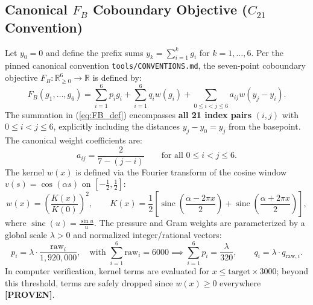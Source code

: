 \documentclass[11pt,a4paper]{article}
\theoremstyle{remark}
\newcommand{\sinc}{\operatorname{sinc}}
\begin{document}
\subsection{Canonical $F_B$ Coboundary Objective ($C_{21}$ Convention)}
Let $y_0 = 0$ and define the prefix sums $y_k = \sum_{i=1}^k g_i$ for $k=1,\ldots,6$. Per the pinned canonical convention \texttt{tools/CONVENTIONS.md}, the seven-point coboundary objective $F_B: \mathbb{R}_{\ge 0}^6 \to \mathbb{R}$ is defined by:
\begin{equation}
 F_B(g_1,\ldots,g_6) = \sum_{i=1}^6 p_i g_i + \sum_{i=1}^6 q_i w(g_i) + \sum_{0 \le i < j \le 6} a_{ij} w(y_j - y_i).
 \label{eq:FB_def}
\end{equation}
The summation in (\ref{eq:FB_def}) encompasses \textbf{all 21 index pairs} $(i,j)$ with $0 \le i < j \le 6$, explicitly including the distances $y_j - y_0 = y_j$ from the basepoint. The canonical weight coefficients are:
\[
 a_{ij} = \frac{2}{7 - (j - i)} \qquad \text{for all } 0 \le i < j \le 6.
\]
The kernel $w(x)$ is defined via the Fourier transform of the cosine window $v(s) = \cos(\alpha s)$ on $[-\frac{1}{2}, \frac{1}{2}]$:
\begin{equation}
 w(x) = \left(\frac{K(x)}{K(0)}\right)^2, \qquad K(x) = \frac{1}{2}\left[\sinc\left(\frac{\alpha - 2\pi x}{2}\right) + \sinc\left(\frac{\alpha + 2\pi x}{2}\right)\right],
\end{equation}
where $\sinc(u) = \frac{\sin u}{u}$. The pressure and Gram weights are parameterized by a global scale $\lambda > 0$ and normalized integer/rational vectors:
\[
 p_i = \lambda \cdot \frac{\text{raw}_i}{1{,}920{,}000}, \quad \text{with } \sum_{i=1}^6 \text{raw}_i = 6000 \implies \sum_{i=1}^6 p_i = \frac{\lambda}{320}, \qquad q_i = \lambda \cdot q_{\text{raw}, i}.
\]
In computer verification, kernel terms are evaluated for $x \le \text{target} \times 3000$; beyond this threshold, terms are safely dropped since $w(x) \ge 0$ everywhere \textbf{[PROVEN]}.
\end{document}
